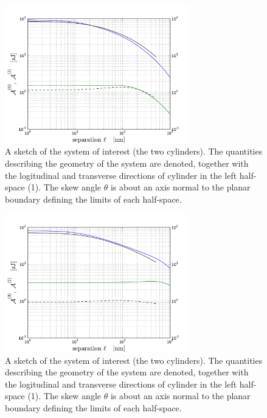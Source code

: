 \documentclass[onecolumn,letterpaper,amsmath,amssymb,floatfix,aps,superscriptaddress]{revtex4}
\begin{document}
\begin{figure}
\centerline{\includegraphics[width=8cm]{140309_91w91_GH_skew_ret_A0_A2.pdf}}
\caption{A sketch of the system of interest (the two cylinders). The quantities describing the geometry of the system are 
denoted, together with the logitudinal and transverse directions of cylinder in the left half-space (1). The skew angle $\theta$ is about an axis normal to the planar boundary defining the limits of each half-space.
}
\label{fig:sketch}
\end{figure}

\begin{figure}
\centerline{\includegraphics[width=8cm]{140309_93w93_GH_skew_ret_A0_A2.pdf}}
\caption{A sketch of the system of interest (the two cylinders). The quantities describing the geometry of the system are 
denoted, together with the logitudinal and transverse directions of cylinder in the left half-space (1). The skew angle $\theta$ is about an axis normal to the planar boundary defining the limits of each half-space.
}
\label{fig:sketch}
\end{figure}
\end{document}
